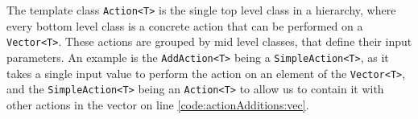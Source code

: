 The template class \texttt{Action<T>} is the single top level class in a hierarchy, where every bottom level class is a concrete action that can be performed on a \texttt{Vector<T>}. These actions are grouped by mid level classes, that define their input parameters. An example is the \texttt{AddAction<T>} being a \texttt{SimpleAction<T>}, as it takes a single input value to perform the action on an element of the \texttt{Vector<T>}, and the \texttt{SimpleAction<T>} being an \texttt{Action<T>} to allow us to contain it with other actions in the  vector on line \ref{code:actionAdditions:vec}.

